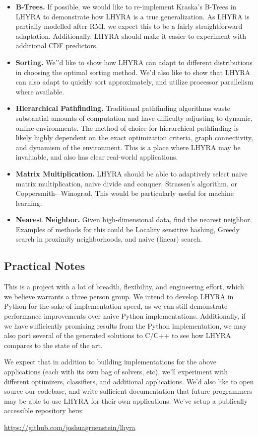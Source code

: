 \documentclass{article}
\begin{document}
\begin{itemize}
	\item \textbf{B-Trees.} If possible, we would like to re-implement Kraska’s B-Trees in LHYRA to demonstrate how LHYRA is a true generalization. As LHYRA is partially modelled after RMI, we expect this to be a fairly straightforward adaptation. Additionally, LHYRA should make it easier to experiment with additional CDF predictors.
	\item \textbf{Sorting.} We’'d like to show how LHYRA can adapt to different distributions in choosing the optimal sorting method. We’d also like to show that LHYRA can also adapt to quickly sort approximately, and utilize processor parallelism where available.
	\item \textbf{Hierarchical Pathfinding.} Traditional pathfinding algorithms waste substantial amounts of computation and have difficulty adjusting to dynamic, online environments. The method of choice for hierarchical pathfinding is likely highly dependent on the exact optimization criteria, graph connectivity, and dynamism of the environment. This is a place where LHYRA may be invaluable, and also has clear real-world applications.
	\item \textbf{Matrix Multiplication.} LHYRA should be able to adaptively select naive matrix multiplication, naive divide and conquer, Strassen’s algorithm, or Coppersmith-–Winograd. This would be particularly useful for machine learning.
	\item \textbf{Nearest Neighbor.} Given high-dimensional data, find the nearest neighbor. Examples of methods for this could be Locality sensitive hashing, Greedy search in proximity neighborhoods, and naive (linear) search.

\end{itemize}

\subsection*{Practical Notes}

This is a project with a lot of breadth, flexibility, and engineering effort, which we believe warrants a three person group. We intend to develop LHYRA in Python for the sake of implementation speed, as we can still demonstrate performance improvements over naive Python implementations. Additionally, if we have sufficiently promising results from the Python implementation, we may also port several of the generated solutions to C/C++ to see how LHYRA compares to the state of the art.

We expect that in addition to building implementations for the above applications (each with its own bag of solvers, etc), we’ll experiment with different optimizers, classifiers, and additional applications. We’d also like to open source our codebase, and write sufficient documentation that future programmers may be able to use LHYRA for their own applications. We've setup a publically accessible repository here:

\begin{center}
\url{https://github.com/joshuagruenstein/lhyra}
\end{center}
\end{document}
